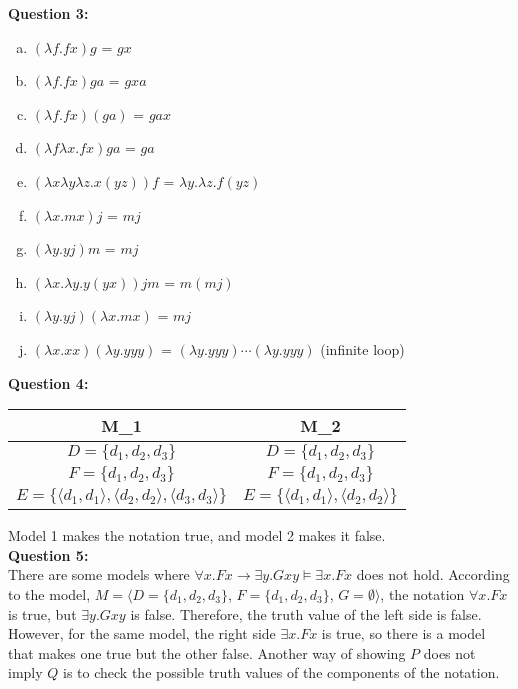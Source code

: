 \documentclass[11pt,a4paper]{article}
\begin{document}
\noindent \textbf{Question 3:}
\begin{enumerate}[(a)]
\item $(\lambda f.fx)g $ = $gx$
\item $(\lambda f.fx)ga$ = $gxa$
\item $(\lambda f.fx)(ga)$ = $gax$
\item $(\lambda f\lambda x.fx)g a$ = $ga$
\item $(\lambda x\lambda y \lambda z.x(yz))f$ = $\lambda y.\lambda z.f(yz)$
\item $(\lambda x. m x)j$ = $mj$
\item $(\lambda y. y j)m$ = $mj$
\item $(\lambda x.\lambda y. y(y x))jm$ = $m(mj)$
\item $(\lambda y.y j)(\lambda x. m x)$ = $mj$
\item $(\lambda x. xx)(\lambda y. yyy)$ = $(\lambda y.yyy)\cdots (\lambda y.yyy)$ (infinite loop)
\end{enumerate}

\noindent \textbf{Question 4:}\\
\begin{tabular}{cc}
M_1 & M_2 \\ \hline
$D=\lbrace d_1,d_2,d_3\rbrace$ & $D=\lbrace d_1,d_2,d_3\rbrace$\\
$F=\lbrace d_1,d_2,d_3\rbrace$ & $F=\lbrace d_1,d_2,d_3\rbrace$\\
$E=\lbrace \langle d_1,d_1\rangle, \langle d_2,d_2\rangle,\langle d_3,d_3\rangle\rbrace$ & 
$E=\lbrace \langle d_1,d_1\rangle, \langle d_2,d_2\rangle\rbrace$
\end{tabular}

\vspace{10pt}

\noindent Model 1 makes the notation true, and model 2 makes it false.\\

\noindent \textbf{Question 5:}\\
There are some models where $\forall x.Fx \rightarrow \exists y.Gxy \models \exists x.Fx$ does not hold. According to the model, $M=\langle D=\lbrace d_1,d_2,d_3\rbrace$, $F=\lbrace d_1,d_2,d_3\rbrace$, $G=\emptyset\rangle$, the notation $\forall x.Fx$ is true, but $\exists y.Gxy$ is false. Therefore, the truth value of the left side is false. However, for the same model, the right side $\exists x.Fx$ is true, so there is a model that makes one true but the other false. Another way of showing $P$ does not imply $Q$ is to check the possible truth values of the components of the notation.\\
\end{document}
